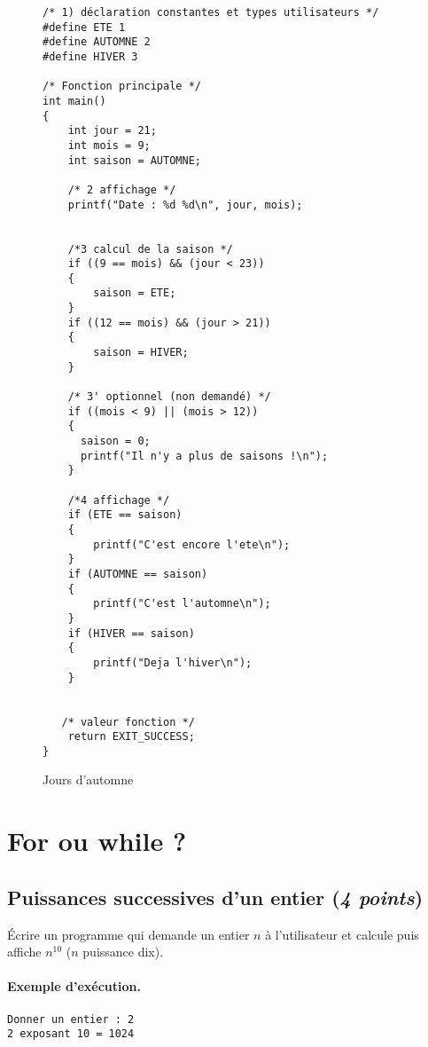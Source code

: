 \begin{correction}
\begin{figure}[htbp]
\begin{small}
\begin{verbatim}
/* 1) déclaration constantes et types utilisateurs */
#define ETE 1
#define AUTOMNE 2
#define HIVER 3

/* Fonction principale */
int main()
{
    int jour = 21;
    int mois = 9;
    int saison = AUTOMNE;
    
    /* 2 affichage */
    printf("Date : %d %d\n", jour, mois);


    /*3 calcul de la saison */
    if ((9 == mois) && (jour < 23)) 
    {
        saison = ETE;
    }
    if ((12 == mois) && (jour > 21)) 
    {
        saison = HIVER;
    }

    /* 3' optionnel (non demandé) */
    if ((mois < 9) || (mois > 12))
    {
      saison = 0;
      printf("Il n'y a plus de saisons !\n");
    }

    /*4 affichage */
    if (ETE == saison)
    {
        printf("C'est encore l'ete\n");
    }
    if (AUTOMNE == saison)
    {
        printf("C'est l'automne\n");
    }
    if (HIVER == saison)
    {
        printf("Deja l'hiver\n");
    }


   /* valeur fonction */
    return EXIT_SUCCESS;
}
\end{verbatim}
\end{small}
  \caption{Jours d'automne}
  \label{automne}
\end{figure}
  \end{correction}

\section{For ou while ?}
\subsection{Puissances successives d'un entier (\emph{4 points})}

\question Écrire un programme qui demande un entier $n$ à l'utilisateur et
calcule puis affiche $n^{10}$ ($n$ puissance dix). 
\paragraph{Exemple d'exécution.} 
\begin{small}
\begin{verbatim}
Donner un entier : 2
2 exposant 10 = 1024
\end{verbatim}
\end{small}


